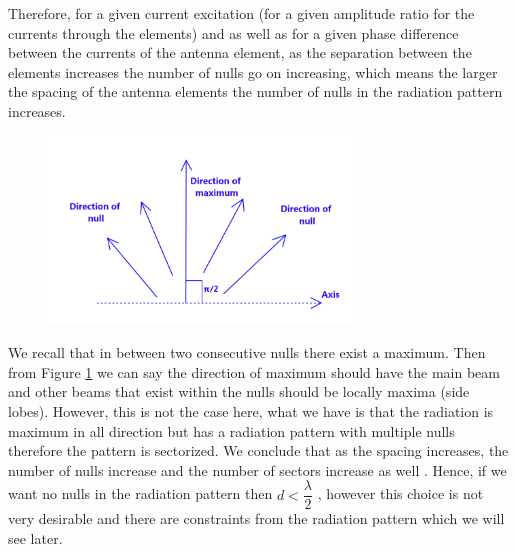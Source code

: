 Therefore, for a given current excitation (for a given amplitude ratio for the currents through the elements) and as well as for a given phase difference between the currents of the antenna element, as the separation between the elements increases the number of nulls go on increasing, which means the larger the spacing of the antenna elements the number of nulls in the radiation pattern increases.
\begin{figure}[h]
\centering
\includegraphics[height=5cm]{./graphics/fig52_3}
\caption{}
\label{52.3}
\end{figure}

We recall that in between two consecutive nulls there exist a maximum. Then from Figure \ref{52.3} we can say the direction of maximum should have the main beam and other beams that exist within the nulls should be locally maxima (side lobes). However, this is not the case here, what we have is that the radiation is maximum in all direction but has a radiation pattern with multiple nulls therefore the pattern is sectorized. We conclude that as the spacing increases, the number of nulls increase and the number of sectors increase as well . Hence, if we want no nulls in the radiation pattern then $ d < \dfrac{\lambda}{2} $ , however this choice is not very desirable and there are constraints from the radiation pattern which we will see later.

